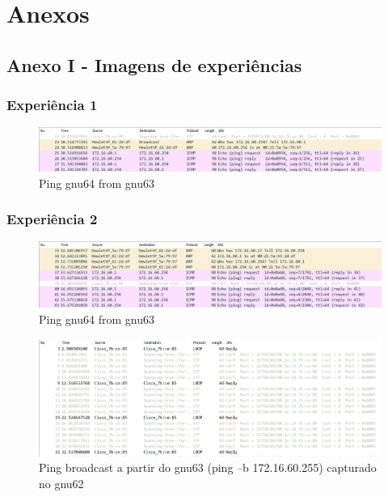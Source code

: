 \documentclass[article, a4paper, 11pt, oneside]{memoir}
\begin{document}
\newpage
\chapter[Anexos][Anexos]{Anexos} \label{\thechapter}

\section{Anexo I - Imagens de experiências}
\subsection{Experiência 1}

\begin{figure}[h]
	\centering
\includegraphics[scale=0.55]{exp1-gnu63.png}
\caption{Ping gnu64 from gnu63}
\end{figure}

\newpage
\subsection{Experiência 2}
\begin{figure}[h]
	\centering
\includegraphics[scale=0.55]{exp2-step5-ping-gnu64-from-gnu63.png}
\caption{Ping gnu64 from gnu63}
\end{figure}

\begin{figure}[h]
	\centering
\includegraphics[scale=0.55]{exp2-step8-broadcast-gnu63-from-gnu62.png}
\caption{Ping broadcast a partir do gnu63 (ping –b 172.16.60.255) capturado no gnu62}
\end{figure}
\end{document}
